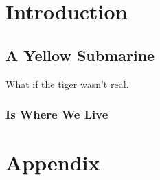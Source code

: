 \documentclass[arial, double]{wvuthesis}
\begin{document}

\chapter{Introduction}
\pagestyle{plain}
\justify
{}
\lipsum[3-6]
\section{A Yellow Submarine}
\lipsum[12-20]

What if the tiger wasn't real. \cite{Liounis:2016}
\subsection{Is Where We Live}
\lipsum[1]




\chapter*{Appendix}
\lipsum[17-23]
\end{document}
